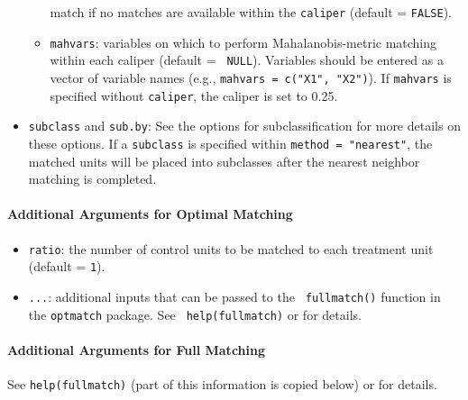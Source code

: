 \begin{itemize}
\begin{itemize}
    match if no matches are available within the \texttt{caliper}
    (default = {\tt FALSE}).
  \item \texttt{mahvars}: variables on which to perform
    Mahalanobis-metric matching within each caliper (default = {\tt
      NULL}).  Variables should be entered as a vector of variable
    names (e.g., \texttt{mahvars = c("X1", "X2")}).  If
    \texttt{mahvars} is specified without \texttt{caliper}, the
    caliper is set to 0.25.
  \end{itemize}
\item \texttt{subclass} and \texttt{sub.by}: See the options for
  subclassification for more details on these options.  If a
  \texttt{subclass} is specified within \texttt{method = "nearest"},
  the matched units will be placed into subclasses after the nearest
  neighbor matching is completed.
\end{itemize}

\paragraph{Additional Arguments for Optimal Matching}
\label{subsubsec:inputs-optimal}

\begin{itemize}
\item {\tt ratio}: the number of control units to be matched to each
  treatment unit (default = {\tt 1}).
\item {\tt ...}: additional inputs that can be passed to the {\tt
    fullmatch()} function in the {\tt optmatch} package. See {\tt
    help(fullmatch)} or
  for details.
\end{itemize}

\paragraph{Additional Arguments for Full Matching}
\label{subsubsec:inputs-full}

See {\tt help(fullmatch)} (part of this information is copied below)
or
for details.

